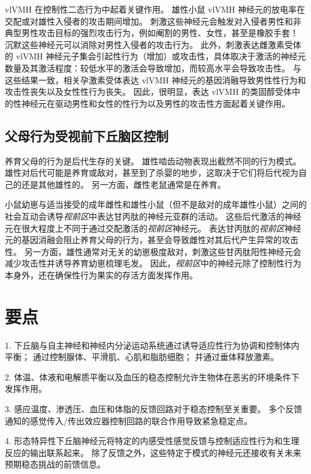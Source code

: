 vlVMH 在控制性二态行为中起着关键作用。
雄性小鼠 vlVMH 神经元的放电率在交配或对雄性入侵者的攻击期间增加。
刺激这些神经元会触发对入侵者男性和非典型男性攻击目标的强烈攻击行为，例如阉割的男性、女性，甚至是橡胶手套！
沉默这些神经元可以消除对男性入侵者的攻击行为。
此外，刺激表达雌激素受体的 vlVMH 神经元子集会引起性行为（增加）或攻击性，具体取决于激活的神经元数量及其激活程度：较低水平的激活会导致增加，而较高水平会导致攻击性。
与这些结果一致，相关孕激素受体表达 vlVMH 神经元的基因消融导致男性性行为和攻击性丧失以及女性性行为丧失。
因此，很明显，表达 vlVMH 的类固醇受体中的性神经元在驱动男性和女性的性行为以及男性的攻击性方面起着关键作用。



\subsection{父母行为受视前下丘脑区控制}

养育父母的行为是后代生存的关键。
雄性啮齿动物表现出截然不同的行为模式。
雄性对后代可能是养育或敌对，甚至到了杀婴的地步，这取决于它们将后代视为自己的还是其他雄性的。
另一方面，雌性老鼠通常是在养育。


小鼠幼崽与适当接受的成年雌性和雄性小鼠（但不是敌对的成年雄性小鼠）之间的社会互动会诱导\textit{视前区}中表达甘丙肽的神经元亚群的活动。
这些后代激活的神经元在很大程度上不同于通过交配激活的\textit{视前区}神经元。
表达甘丙肽的\textit{视前区}神经元的基因消融会阻止养育父母的行为，甚至会导致雌性对其后代产生异常的攻击性。
另一方面，雄性通常对无关的幼崽极度敌对，刺激这些甘丙肽阳性神经元会减少攻击性并诱导养育幼崽梳理毛发。
因此，\textit{视前区}中的神经元除了控制性行为本身外，还在确保性行为果实的存活方面发挥作用。



\section{要点}

1. 下丘脑与自主神经和神经内分泌运动系统通过诱导适应性行为协调和控制体内平衡；
通过控制腺体、平滑肌、心肌和脂肪细胞；
并通过垂体释放激素。 


2. 体温、体液和电解质平衡以及血压的稳态控制允许生物体在恶劣的环境条件下发挥作用。


3. 感应温度、渗透压、血压和体脂的反馈回路对于稳态控制至关重要。
多个反馈通知的感觉传入/传出效应器控制回路的联合作用导致紧急稳定点。


4. 形态特异性下丘脑神经元将特定的内感受性感觉反馈与控制适应性行为和生理反应的输出联系起来。
除了反馈之外，这些特定于模式的神经元还接收有关未来预期稳态挑战的前馈信息。


